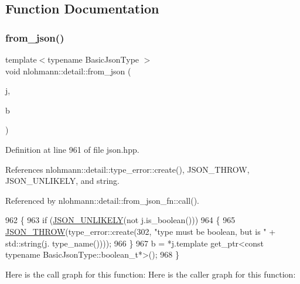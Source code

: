\subsection{Function Documentation}
\mbox{\label{namespacenlohmann_1_1detail_a58117f225f43d03e3a0a4a6f3d77c9d9}} 
\subsubsection{\texorpdfstring{from\+\_\+json()}{from\_json()}\hspace{0.1cm}{\footnotesize\ttfamily [1/14]}}
{\footnotesize\ttfamily template$<$typename Basic\+Json\+Type $>$ \\
void nlohmann\+::detail\+::from\+\_\+json (\begin{DoxyParamCaption}\item[{const Basic\+Json\+Type \&}]{j,  }\item[{typename Basic\+Json\+Type\+::boolean\+\_\+t \&}]{b }\end{DoxyParamCaption})}



Definition at line 961 of file json.\+hpp.



References nlohmann\+::detail\+::type\+\_\+error\+::create(), J\+S\+O\+N\+\_\+\+T\+H\+R\+OW, J\+S\+O\+N\+\_\+\+U\+N\+L\+I\+K\+E\+LY, and string.



Referenced by nlohmann\+::detail\+::from\+\_\+json\+\_\+fn\+::call().


\begin{DoxyCode}
962 \{
963     \textcolor{keywordflow}{if} (\hyperlink{json_8hpp_ab77582407c64944e7db1ea95ab520253}{JSON\_UNLIKELY}(not j.is\_boolean()))
964     \{
965         \hyperlink{json_8hpp_a6c274f6db2e65c1b66c7d41b06ad690f}{JSON\_THROW}(type\_error::create(302, \textcolor{stringliteral}{"type must be boolean, but is "} + std::string(j.
      type\_name())));
966     \}
967     b = *j.template get\_ptr<const typename BasicJsonType::boolean\_t*>();
968 \}
\end{DoxyCode}
Here is the call graph for this function\+:
Here is the caller graph for this function\+:
\mbox{\label{namespacenlohmann_1_1detail_ad74d89f77ada7a57eff38b43d4bf2335}} 
